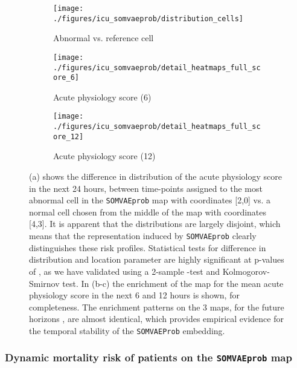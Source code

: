 \documentclass{article}
\begin{document}
\begin{figure}[h!]

\centering
\begin{subfigure}[t]{0.30\textwidth}
\centering
\texttt{[image: ./figures/icu\_somvaeprob/distribution\_cells]}
\caption{Abnormal vs. reference cell}
\end{subfigure}
\begin{subfigure}[t]{0.30\textwidth}
\centering
\texttt{[image: ./figures/icu\_somvaeprob/detail\_heatmaps\_full\_score\_6]}
\caption{Acute physiology score (6)}
\end{subfigure}
\begin{subfigure}[t]{0.30\textwidth}
\centering
\texttt{[image: ./figures/icu\_somvaeprob/detail\_heatmaps\_full\_score\_12]}
\caption{ Acute physiology score (12)}
\end{subfigure}

\caption{(a) shows the difference in distribution of the acute
         physiology score in the next 24 hours, between time-points assigned to the most 
         abnormal cell in the \texttt{SOMVAEprob} map with coordinates [2,0] vs. 
         a normal cell chosen from the middle of the map with coordinates [4,3]. It is apparent that
         the distributions are largely disjoint, which means that the representation induced by 
         \texttt{SOMVAEprob} clearly distinguishes these risk profiles. Statistical tests for difference
         in distribution and location parameter are highly significant at p-values of , as we
         have validated using a 2-sample -test and Kolmogorov-Smirnov test. In (b-c) the enrichment 
         of the map for the mean acute physiology score in the next 6 and 12 hours is shown, for completeness.
         The enrichment patterns on the 3 maps, for the future horizons , are almost identical, 
         which provides empirical evidence for the temporal stability of the \texttt{SOMVAEProb} embedding.}

\end{figure}



\subsubsection*{Dynamic mortality risk of patients on the \texttt{SOMVAEprob} map}
\end{document}
